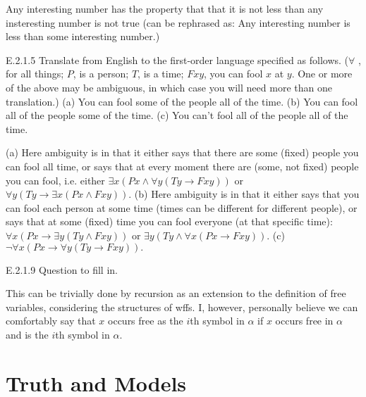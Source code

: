 Any interesting number has the property that that it is not less than any insteresting number is not true (can be rephrased as: Any interesting number is less than some interesting number.)

\setcounter{exercise}{4}

\begin{exercise}{E.2.1.5}
  Translate from English to the first-order language specified as follows. ($\forall$ , for all things; $P$, is a person; $T$, is a time; $Fxy$, you can fool $x$ at $y$. One or more of the above may be ambiguous, in which case you will need more than one translation.) (a) You can fool some of the people all of the time. (b) You can fool all of the people some of the time. (c) You can’t fool all of the people all of the time.
\end{exercise}

(a) Here ambiguity is in that it either says that there are some (fixed) people you can fool all time, or says that at every moment there are (some, not fixed) people you can fool, i.e. either $\exists x(Px\wedge\forall y(Ty\to Fxy))$ or $\forall y(Ty\to\exists x(Px\wedge Fxy))$. (b) Here ambiguity is in that it either says that you can fool each person at some time (times can be different for different people), or says that at some (fixed) time you can fool everyone (at that specific time): $\forall x(Px\to\exists y(Ty\wedge Fxy))$ or $\exists y(Ty\wedge\forall x(Px\to Fxy))$. (c) $\neg\forall x(Px\to\forall y(Ty\to Fxy)).$

\setcounter{exercise}{8}

\begin{exercise}{E.2.1.9}
  Question to fill in.
\end{exercise}

This can be trivially done by recursion as an extension to the definition of free variables, considering the structures of wffs. I, however, personally believe we can comfortably say that $x$ occurs free as the $i$th symbol in $\alpha$ if $x$ occurs free in $\alpha$ and is the $i$th symbol in $\alpha$.

\section{Truth and Models}

